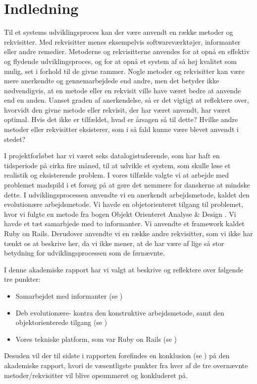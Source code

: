 \chapter{Indledning}

Til et systems udviklingsproces kan der være anvendt en række metoder og rekvisitter. Med rekvisitter menes eksempelvis softwareværktøjer, informanter eller andre remedier. Metoderne og rekvisitterne anvendes for at opnå en effektiv og flydende udviklingsproces, og for at opnå et system af så høj kvalitet som mulig, set i forhold til de givne rammer. Nogle metoder og rekvisitter kan være mere anerkendte og gennemarbejdede end andre, men det betyder ikke nødvendigvis, at en metode eller en rekvisit ville have været bedre at anvende end en anden. Uanset graden af anerkendelse, så er det vigtigt at reflektere over, hvorvidt den givne metode eller rekvisit, der har været anvendt, har været optimal. Hvis det ikke er tilfældet, hvad er årsagen så til dette? Hvilke andre metoder eller rekvisitter eksisterer, som i så fald kunne være blevet anvendt i stedet?

I projektforløbet har vi været seks datalogistuderende, som har haft en tidsperiode på cirka fire måned, til at udvikle et system, som skulle løse et realistik og eksisterende problem. I vores tilfælde valgte vi at arbejde med problemet madspild i et forsøg på at gøre det nemmere for danskerne at mindske dette. I udviklingsprocessen anvendte vi en anerkendt arbejdsmetode, kaldet den evolutionære arbejdsmetode. Vi havde en objetorienteret tilgang til problemet, hvor vi fulgte en metode fra bogen Objekt Orienteret Analyse \& Design \cite{ooad}. Vi havde et tæt samarbjede med to informanter. Vi anvendte et framework kaldet Ruby on Rails. Derudover anvendte vi en række andre rekvisitter, som vi ikke har tænkt os at beskrive her, da vi ikke mener, at de har være af lige så stor betydning for udviklingsprocessen som de førnævnte.

I denne akademiske rapport har vi valgt at beskrive og reflektere over følgende tre punkter:

\begin{itemize}[noitemsep]
  \item Samarbejdet med informanter (se )
  \item Deb evolutionære- kontra den konstruktive arbejdsmetode, samt den objektorienterede tilgang (se )
  \item Vores tekniske platform, som var Ruby on Rails (se )
\end{itemize}

Desuden vil der til sidste i rapporten forefindes en konklusion (se ) på den akademiske rapport, hvori de væsentligste punkter fra hver af de tre overnævnte metoder/rekvisitter vil blive opsummeret og konkluderet på.

